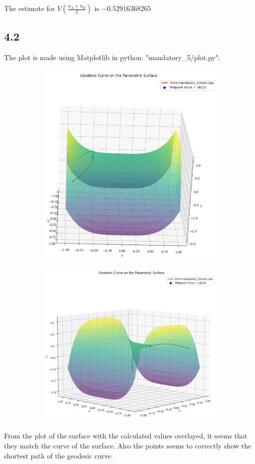 \documentclass{article}
\begin{document}
The estimate for $V\left(\frac{u_A+u_B}{2}\right)$ is $-0.52916368265$
\subsection*{4.2}
The plot is made using Matplotlib in python: "mandatory\_5/plot.py":

\begin{figure}[H]
  \begin{subfigure}[b]{0.49\textwidth}
    \centering
    \includegraphics[width=\textwidth]{../plot_front.png}
  \end{subfigure}
  \begin{subfigure}[b]{0.49\textwidth}
    \centering
    \includegraphics[width=\textwidth]{../plot_side.png}
  \end{subfigure}
\end{figure}

From the plot of the surface with the calculated values overlayed, it seems that they match the curve of the surface. Also the points seems to correctly show the shortest path of the geodesic curve.
\end{document}
